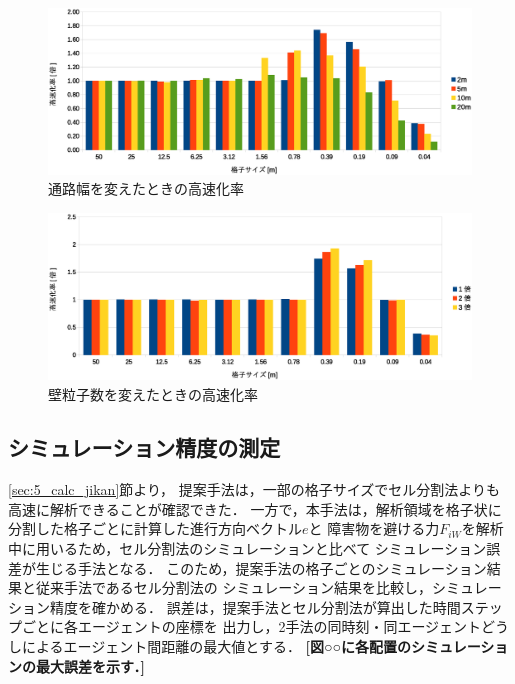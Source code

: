 \begin{figure}[tb]
 \begin{center}
  \includegraphics[width=12.5cm,clip]{figure/5_kousokukaritu.eps}
  \caption{通路幅を変えたときの高速化率}
  \label{fig:5_kousokuka_haba}
 \end{center}
\end{figure}


\begin{figure}[tb]
 \begin{center}
  \includegraphics[width=12.5cm,clip]{figure/5_bai_kousokukaritu.eps}
  \caption{壁粒子数を変えたときの高速化率}
  \label{fig:5_kousokuka_atusa}
 \end{center}
\end{figure}


\clearpage
\subsection{シミュレーション精度の測定}
\ref{sec:5_calc_jikan}節より，
提案手法は，一部の格子サイズでセル分割法よりも高速に解析できることが確認できた．
一方で，本手法は，解析領域を格子状に分割した格子ごとに計算した進行方向ベクトル$e$と
障害物を避ける力$F_{iW}$を解析中に用いるため，セル分割法のシミュレーションと比べて
シミュレーション誤差が生じる手法となる．
このため，提案手法の格子ごとのシミュレーション結果と従来手法であるセル分割法の
シミュレーション結果を比較し，シミュレーション精度を確かめる．
誤差は，提案手法とセル分割法が算出した時間ステップごとに各エージェントの座標を
出力し，2手法の同時刻・同エージェントどうしによるエージェント間距離の最大値とする．
\textbf{
[図○○に各配置のシミュレーションの最大誤差を示す．]
}


